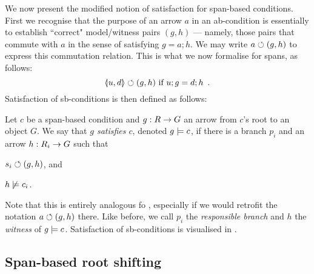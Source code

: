\medskip\noindent We now present the modified notion of satisfaction for span-based conditions. First we recognise that the purpose of an arrow $a$ in an ab-condition is essentially to establish ``correct" model/witness pairs $(g,h)$ --- namely, those pairs that commute with $a$ in the sense of satisfying $g=a;h$. We may write $a\circlearrowleft (g,h)$ to express this commutation relation. This is what we now formalise for spans, as follows:
\[ \spanof u d \commutes (g,h) \text{ if } u;g=d;h \enspace. \]
Satisfaction of sb-conditions is then defined as follows:

\begin{definition}
  Let $c$ be a span-based condition and $g:R\rightarrow G$ an arrow from $c$'s root to an object $G$. We say that \emph{$g$ satisfies $c$}, denoted $g\models c$, if there is a branch $p_i$ and an arrow $h:R_i\rightarrow G$ such that
  \begin{enumerate*}
  \item $s_i \circlearrowleft (g, h)$, and
  \item $h\not\models c_i$.
  \end{enumerate*}
\end{definition}
%
Note that this is entirely analogous fo , especially if we would retrofit the notation $a\circlearrowleft (g,h)$ there. Like before, we call $p_i$ the \emph{responsible branch} and $h$ the \emph{witness} of $g\models c$. Satisfaction of sb-conditions is visualised in .

\subsection{Span-based root shifting}

